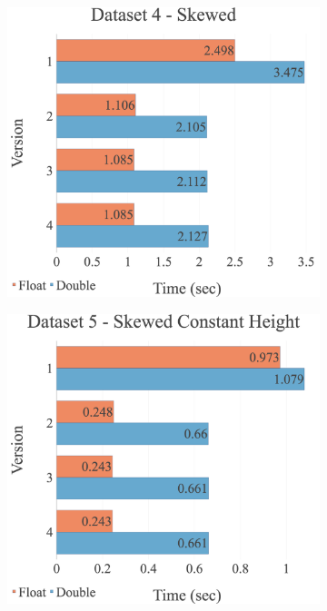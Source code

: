 \begin{figure}[H]
\begin{adjustwidth}{-2cm}{-2cm}
\begin{subfigure}{.62\textwidth}
  \centering
  \includegraphics[width=1\textwidth]{img/experiments/option-versions-4_SKEWED.png}
\end{subfigure}
\begin{subfigure}{.62\textwidth}
  \centering
  \includegraphics[width=1\textwidth]{img/experiments/option-versions-5_SKEWEDCONSTHEIGHT.png}

\end{subfigure}
\end{adjustwidth}
\end{figure}
